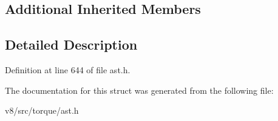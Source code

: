 \subsection*{Additional Inherited Members}


\subsection{Detailed Description}


Definition at line 644 of file ast.\+h.



The documentation for this struct was generated from the following file\+:\begin{DoxyCompactItemize}
\item 
v8/src/torque/ast.\+h\end{DoxyCompactItemize}

